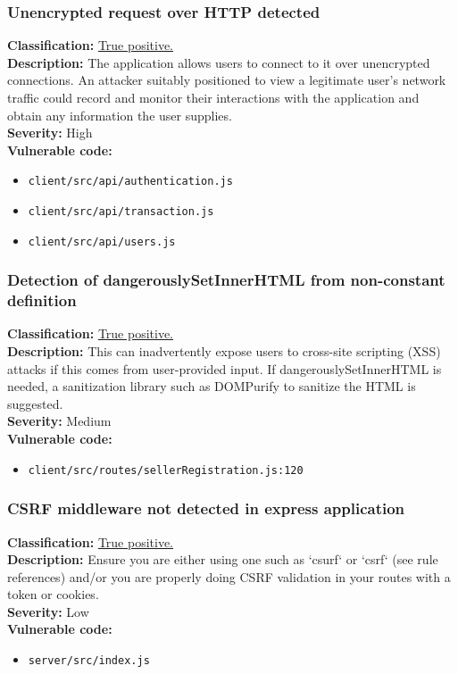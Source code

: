 \documentclass[]{article}
\begin{document}
\subsubsection{Unencrypted request over HTTP detected}
\textbf{Classification:} \hyperref[subsubsec:cleartext_transmission_of_sensitive_information]{True positive.} \\
\textbf{Description:}  The application allows users to connect to it over unencrypted connections. An attacker suitably positioned to view a legitimate user's network traffic could record and monitor their interactions with the application and obtain any information the user supplies. \\ 
\textbf{Severity:}  High \\ 
\textbf{Vulnerable code:}
\begin{itemize}
    \item \texttt{client/src/api/authentication.js}
    \item \texttt{client/src/api/transaction.js}
    \item \texttt{client/src/api/users.js}
\end{itemize}

\subsubsection{Detection of dangerouslySetInnerHTML from non-constant definition}
\textbf{Classification:} \hyperref[par:stored_xss]{True positive.} \\ 
\textbf{Description:} This can inadvertently expose users to cross-site scripting (XSS) attacks if this comes from user-provided input. If dangerouslySetInnerHTML is needed, a sanitization library such as DOMPurify to sanitize the HTML is suggested. \\ 
\textbf{Severity:}  Medium \\ 
\textbf{Vulnerable code:}
\begin{itemize}
    \item \texttt{client/src/routes/sellerRegistration.js:120}
\end{itemize}

\subsubsection{CSRF middleware not detected in express application}
\textbf{Classification:} \hyperref[subsubsec:csrf_with_samesite_none_misconfiguration]{True positive.} \\ 
\textbf{Description:}  Ensure you are either using one such
          as `csurf` or `csrf` (see rule references) and/or you are properly doing CSRF validation in your    
          routes with a token or cookies.\\ 
\textbf{Severity:}  Low \\ 
\textbf{Vulnerable code:}
\begin{itemize}
    \item \texttt{server/src/index.js}
\end{itemize}
\end{document}
